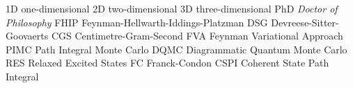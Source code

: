                     {1D}    {one-dimensional}
                    {2D}    {two-dimensional}
                    {3D}    {three-dimensional}
  {PhD}   {\emph{Doctor of Philosophy}}
 {FHIP}  {Feynman-Hellwarth-Iddings-Platzman}
  {DSG}   {Devreese-Sitter-Goovaerts}
  {CGS}   {Centimetre-Gram-Second}
  {FVA}   {Feynman Variational Approach}
 {PIMC}  {Path Integral Monte Carlo}
 {DQMC}  {Diagrammatic Quantum Monte Carlo}
  {RES}   {Relaxed Excited States}
   {FC}    {Franck-Condon}
   {CSPI}    {Coherent State Path Integral}

